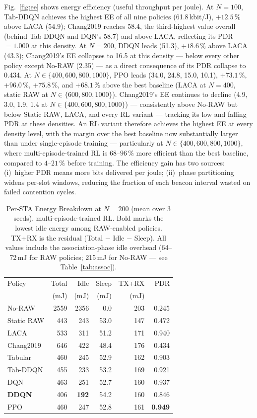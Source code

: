 \documentclass[conference]{IEEEtran}
\begin{document}
Fig.~\ref{fig:ee} shows energy efficiency (useful throughput per joule).
At $N = 100$, Tab-DDQN achieves the highest EE of all nine policies
(61.8\,kbit/J), $+12.5\,\%$ above LACA (54.9); Chang2019 reaches 58.4, the
third-highest value overall (behind Tab-DDQN and DQN's 58.7) and above
LACA, reflecting its PDR$=1.000$ at this density.
At $N = 200$, DDQN leads (51.3), $+18.6\,\%$ above LACA (43.3); Chang2019's
EE collapses to 16.5 at this density — below every other policy except
No-RAW (2.35) — as a direct consequence of its PDR collapse to 0.434.
At $N \in \{400,600,800,1000\}$, PPO leads (34.0, 24.8, 15.0, 10.1),
$+73.1\,\%$, $+96.0\,\%$, $+75.8\,\%$, and $+68.1\,\%$ above the best
baseline (LACA at $N=400$, static RAW at $N\in\{600,800,1000\}$).
Chang2019's EE continues to decline (4.9, 3.0, 1.9, 1.4 at
$N\in\{400,600,800,1000\}$) — consistently above No-RAW but below Static
RAW, LACA, and every RL variant — tracking its low and falling PDR at these
densities.
An RL variant therefore achieves the highest EE at every density level,
with the margin over the best baseline now substantially larger than under
single-episode training — particularly at $N \in \{400,600,800,1000\}$,
where multi-episode-trained RL is $68$--$96\,\%$ more efficient than the
best baseline, compared to $4$--$21\,\%$ before training.
The efficiency gain has two sources: (i)~higher PDR means more bits
delivered per joule; (ii)~phase partitioning widens per-slot windows,
reducing the fraction of each beacon interval wasted on failed contention
cycles.

\begin{table}[t]
\centering
\caption{Per-STA Energy Breakdown at $N = 200$ (mean over 3 seeds),
multi-episode-trained RL.
Bold marks the lowest idle energy among RAW-enabled policies.
TX+RX is the residual (Total $-$ Idle $-$ Sleep).
All values include the association-phase idle overhead
(64–72\,mJ for RAW policies; 215\,mJ for No-RAW — see Table~\ref{tab:assoc}).}
\label{tab:energy}
\setlength{\tabcolsep}{4pt}
\begin{tabular}{lrrrrr}
\toprule
Policy & Total & Idle & Sleep & TX+RX & PDR \\
       & (mJ)  & (mJ) & (mJ) & (mJ) & \\
\midrule
No-RAW          & 2559 & 2356 &  0.0 & 203 & 0.245 \\
Static RAW      &  443 &  243 & 53.0 & 147 & 0.472 \\
LACA            &  533 &  311 & 51.2 & 171 & 0.940 \\
Chang2019       &  646 &  422 & 48.4 & 176 & 0.434 \\
\midrule
Tabular         &  460 &  245 & 52.9 & 162 & 0.903 \\
Tab-DDQN        &  455 &  233 & 53.2 & 169 & 0.921 \\
DQN             &  463 &  251 & 52.7 & 160 & 0.937 \\
\textbf{DDQN}   &  406 & \textbf{192} & 54.2 & 160 & 0.846 \\
PPO             &  460 &  247 & 52.8 & 161 & \textbf{0.949} \\
\bottomrule
\end{tabular}
\end{table}
\end{document}
